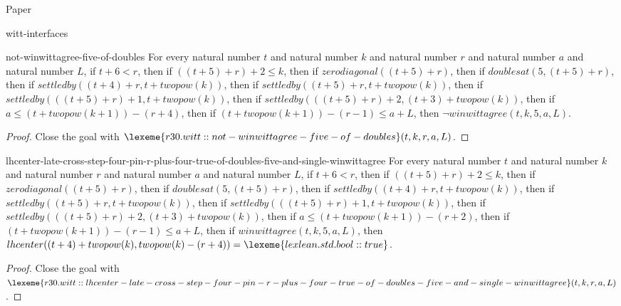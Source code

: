 \begin{lexlean}{Paper}
\begin{section}{witt-interfaces}
  \begin{theorem}{not-winwittagree-five-of-doubles}
  For every natural number \(t\) and natural number \(k\) and natural number \(r\) and natural number \(a\) and natural number \(L\), if \(t + 6 < r\), then if \(((t + 5) + r) + 2 ≤ k\), then if \(zerodiagonal((t + 5) + r)\), then if \(doublesat(5, (t + 5) + r)\), then if \(settledby((t + 4) + r, t + twopow(k))\), then if \(settledby((t + 5) + r, t + twopow(k))\), then if \(settledby(((t + 5) + r) + 1, t + twopow(k))\), then if \(settledby(((t + 5) + r) + 2, (t + 3) + twopow(k))\), then if \(a ≤ (t + twopow(k + 1)) - (r + 4)\), then if \((t + twopow(k + 1)) - (r - 1) ≤ a + L\), then \(¬ winwittagree(t, k, 5, a, L)\).
  \begin{proof}
  Close the goal with \(\lexeme{r30.witt::not-winwittagree-five-of-doubles}(t, k, r, a, L)\).
  \end{proof}
  \end{theorem}

  \begin{theorem}{lhcenter-late-cross-step-four-pin-r-plus-four-true-of-doubles-five-and-single-winwittagree}
  For every natural number \(t\) and natural number \(k\) and natural number \(r\) and natural number \(a\) and natural number \(L\), if \(t + 6 < r\), then if \(((t + 5) + r) + 2 ≤ k\), then if \(zerodiagonal((t + 5) + r)\), then if \(doublesat(5, (t + 5) + r)\), then if \(settledby((t + 4) + r, t + twopow(k))\), then if \(settledby((t + 5) + r, t + twopow(k))\), then if \(settledby(((t + 5) + r) + 1, t + twopow(k))\), then if \(settledby(((t + 5) + r) + 2, (t + 3) + twopow(k))\), then if \(a ≤ (t + twopow(k + 1)) - (r + 2)\), then if \((t + twopow(k + 1)) - (r - 1) ≤ a + L\), then if \(winwittagree(t, k, 5, a, L)\), then \(lhcenter((t + 4) + twopow(k), twopow(k) - (r + 4)) = \lexeme{lexlean.std.bool::true}\).
  \begin{proof}
  Close the goal with \(\lexeme{r30.witt::lhcenter-late-cross-step-four-pin-r-plus-four-true-of-doubles-five-and-single-winwittagree}(t, k, r, a, L)\).
  \end{proof}
  \end{theorem}


\end{section}
\end{lexlean}
